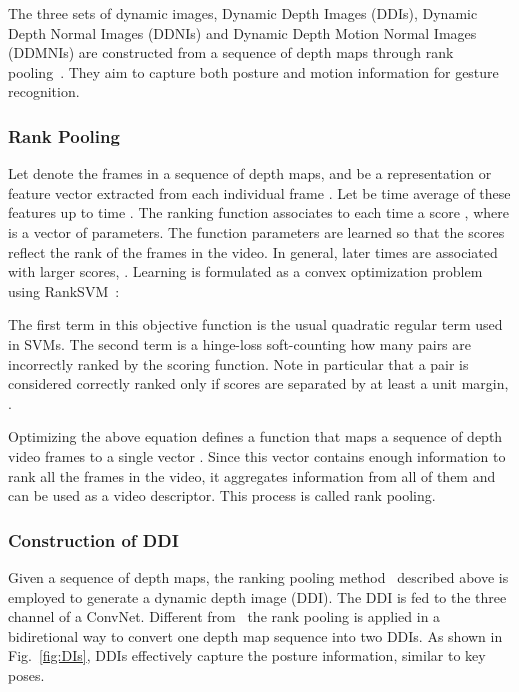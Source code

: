 \documentclass[10pt, a4paper, conference]{IEEEtran}
\begin{document}
The three sets of dynamic images, Dynamic Depth Images (DDIs), Dynamic Depth Normal Images (DDNIs) and Dynamic Depth Motion Normal Images (DDMNIs) are constructed from a sequence of depth maps through rank pooling~\cite{bilen2016dynamic}. They aim to capture both posture and motion information for gesture recognition.

\subsubsection{Rank Pooling}

Let  denote the frames in a sequence of depth maps, and  be a representation or feature vector extracted from each individual frame . Let  be time average of these features up to time . The ranking function associates to each time  a score , where  is a vector of parameters. The function parameters  are learned so that the scores reflect the rank of the frames in the video. In general, later times are associated with larger scores, . Learning  is formulated as a convex optimization problem using RankSVM~\cite{smola2004tutorial}:



The first term in this objective function is the usual quadratic regular term used in SVMs. The second term is a hinge-loss soft-counting how many pairs  are incorrectly ranked by the scoring function. Note in particular that a pair is considered correctly ranked only if scores are separated by at least a unit margin, . 

Optimizing the above equation defines a function  that maps a sequence of  depth video frames to a single vector . Since this vector contains enough information to rank all the frames in the video, it aggregates information from all of them and can be used as a video descriptor. This process is called rank pooling. 

\subsubsection{Construction of DDI}
Given a sequence of depth maps, the ranking pooling method~\cite{bilen2016dynamic} described above is employed to generate a dynamic depth image (DDI).  The DDI is fed to the three channel of a ConvNet. Different from~\cite{bilen2016dynamic} the rank pooling is applied in a bidiretional way to convert one depth map sequence into two DDIs. As shown in Fig.~\ref{fig:DIs}, DDIs effectively capture the posture information, similar to key poses.
\end{document}
